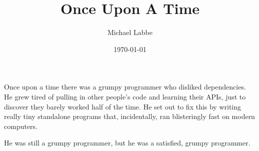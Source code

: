 \documentclass{article}
\title{Once Upon A Time}
\author{Michael Labbe}
\date{\today}
\begin{document}
Once upon a time there was a grumpy programmer who disliked dependencies.  He grew tired of pulling in other people's code and learning their APIs, just to discover they barely worked half of the time.  He set out to fix this by writing really tiny standalone programs that, incidentally, ran blisteringly fast on modern computers.

He was still a grumpy programmer, but he was a satisfied, grumpy programmer.
\end{document}
